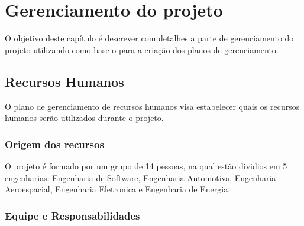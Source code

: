 \chapter{Gerenciamento do projeto}

O objetivo deste capítulo é descrever com detalhes a parte de gerenciamento do projeto utilizando como base o \cite{pmbok} para a criação dos planos de gerenciamento.

\section{Recursos Humanos}

O plano de gerenciamento de recursos humanos visa estabelecer quais os recursos humanos serão utilizados durante o projeto.

\subsection{Origem dos recursos}

O projeto é formado por um grupo de 14 pessoas, na qual estão dividios em 5 engenharias: Engenharia de Software, Engenharia Automotiva, Engenharia Aeroespacial, Engenharia Eletronica e Engenharia de Energia.

\subsection{Equipe e Responsabilidades}

